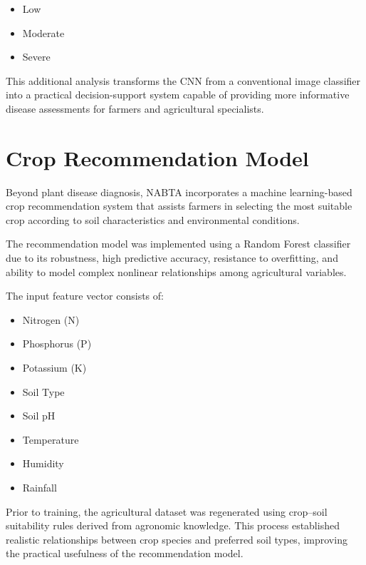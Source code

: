 \begin{itemize}[leftmargin=*]

\item Low

\item Moderate

\item Severe

\end{itemize}

This additional analysis transforms the CNN from a conventional image classifier into a practical decision-support system capable of providing more informative disease assessments for farmers and agricultural specialists.

\section{Crop Recommendation Model}
\label{sec:crop_methodology}

Beyond plant disease diagnosis, NABTA incorporates a machine learning-based crop recommendation system that assists farmers in selecting the most suitable crop according to soil characteristics and environmental conditions.

The recommendation model was implemented using a Random Forest classifier due to its robustness, high predictive accuracy, resistance to overfitting, and ability to model complex nonlinear relationships among agricultural variables.

The input feature vector consists of:

\begin{itemize}[leftmargin=*]
\item Nitrogen (N)
\item Phosphorus (P)
\item Potassium (K)
\item Soil Type
\item Soil pH
\item Temperature
\item Humidity
\item Rainfall
\end{itemize}

Prior to training, the agricultural dataset was regenerated using crop--soil suitability rules derived from agronomic knowledge. This process established realistic relationships between crop species and preferred soil types, improving the practical usefulness of the recommendation model.

